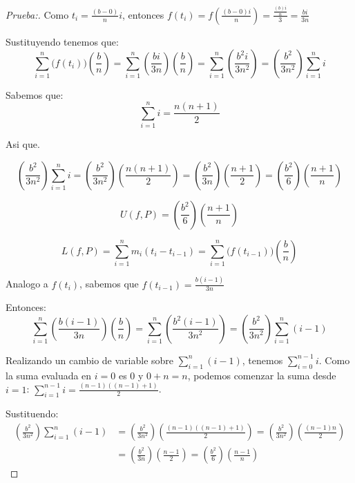 \documentclass[12pt]{article}
\begin{document}
\begin{enumerate}[\hspace{9px} a)]
\begin{proof}[Prueba:]
        Como \(t_i=\displaystyle\frac{(b-0)}{n}i\), entonces \(f(t_i)=f\left(\displaystyle\frac{(b-0)i}{n}\right) = \frac{\frac{(b)i}{n}}{3} = \frac{bi}{3n}\)

        Sustituyendo tenemos que:
        \begin{equation*}
            \sum_{i=1}^n \big(f(t_i)\big)\left(\displaystyle\frac{b}{n}\right) = \sum_{i=1}^n \left(\frac{bi}{3n}\right)\left(\displaystyle\frac{b}{n}\right) = \sum_{i=1}^n \left(\frac{b^2i}{3n^2}\right) = \left(\frac{b^2}{3n^2}\right) \sum_{i=1}^n i
        \end{equation*}

        Sabemos que: \[\sum_{i=1}^n i = \frac{n(n+1)}{2}\]
        
        Asi que.

        \begin{equation*}
            \left(\frac{b^2}{3n^2}\right) \sum_{i=1}^n i = \left(\frac{b^2}{3n^2}\right)\left(\frac{n(n+1)}{2}\right) = \left(\frac{b^2}{3n}\right)\left(\frac{n+1}{2}\right) =\left(\frac{b^2}{6}\right)\left(\frac{n+1}{n}\right)
        \end{equation*}

        \[U(f,P)=\left(\frac{b^2}{6}\right)\left(\frac{n+1}{n}\right)\]

        \begin{equation*}%
            L(f,P)=\sum_{i=1}^n m_i(t_i-t_{i-1}) = \sum_{i=1}^n \big(f(t_{i-1})\big)\left(\displaystyle\frac{b}{n}\right)
        \end{equation*}

        Analogo a \(f(t_i)\), sabemos que \(f(t_{i-1})=\displaystyle\frac{b(i-1)}{3n}\)

        Entonces:
        \begin{equation*}
            \sum_{i=1}^n \left(\frac{b(i-1)}{3n}\right)\left(\displaystyle\frac{b}{n}\right) = \sum_{i=1}^n \left(\frac{b^2(i-1)}{3n^2}\right) = \left(\frac{b^2}{3n^2}\right)\sum_{i=1}^n (i-1)
        \end{equation*}

        Realizando un cambio de variable sobre \(\sum_{i=1}^n (i-1)\), tenemos \(\sum_{i=0}^{n-1} i\). Como la suma evaluada en $i=0$ es 0 y \(0+n=n\), podemos comenzar la suma desde \(i=1\): \(\sum_{i=1}^{n-1} i = \displaystyle\frac{(n-1)((n-1)+1)}{2}\).

        Sustituendo:
        \begin{align*}
            \left(\frac{b^2}{3n^2}\right)\sum_{i=1}^n (i-1) &= \left(\frac{b^2}{3n^2}\right)\left(\frac{(n-1)((n-1)+1)}{2}\right) = \left(\frac{b^2}{3n^2}\right)\left(\frac{(n-1)n}{2}\right) \\ &= \left(\frac{b^2}{3n}\right)\left(\frac{n-1}{2}\right) = \left(\frac{b^2}{6}\right)\left(\frac{n-1}{n}\right)
        \end{align*}


\end{proof}
\end{enumerate}
\end{document}
